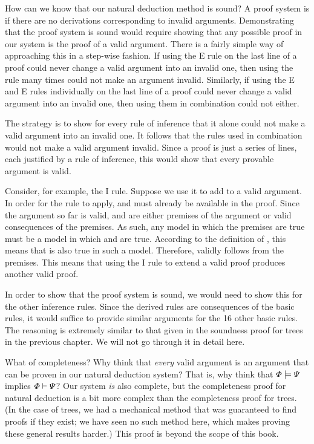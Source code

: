 How can we know that our natural deduction method is sound? A proof system is  if there are no derivations corresponding to invalid arguments. Demonstrating that the proof system is sound would require showing that any possible proof in our system is the proof of a valid argument. There is a fairly simple way of approaching this in a step-wise fashion. If using the {\eand}E rule on the last line of a proof could never change a valid argument into an invalid one, then using the rule many times could not make an argument invalid. Similarly, if using the {\eand}E and {\eor}E rules individually on the last line of a proof could never change a valid argument into an invalid one, then using them in combination could not either.

The strategy is to show for every rule of inference that it alone could not make a valid argument into an invalid one. It follows that the rules used in combination would not make a valid argument invalid. Since a proof is just a series of lines, each justified by a rule of inference, this would show that every provable argument is valid.

Consider, for example, the {\eand}I rule. Suppose we use it to add \metaA{}\eand\metaB{} to a valid argument. In order for the rule to apply, \metaA{} and \metaB{} must already be available in the proof. Since the argument so far is valid, \metaA{} and \metaB{} are either premises of the argument or valid consequences of the premises. As such, any model in which the premises are true must be a model in which \metaA{} and \metaB{} are true. According to the definition of , this means that \metaA{}\eand\metaB{} is also true in such a model. Therefore, \metaA{}\eand\metaB{} validly follows from the premises. This means that using the {\eand}I rule to extend a valid proof produces another valid proof.

In order to show that the proof system is sound, we would need to show this for the other inference rules. Since the derived rules are consequences of the basic rules, it would suffice to provide similar arguments for the 16 other basic rules. The reasoning is extremely similar to that given in the soundness proof for trees in the previous chapter. We will not go through it in detail here.

What of completeness? Why think that \emph{every} valid argument is an argument that can be proven in our natural deduction system? That is, why think that $\varPhi{}\models\varPsi{}$ implies $\varPhi{}\vdash\varPsi{}$? Our system \emph{is} also complete, but the completeness proof for natural deduction is a bit more complex than the completeness proof for trees. (In the case of trees, we had a mechanical method that was guaranteed to find proofs if they exist; we have seen no such method here, which makes proving these general results harder.) This proof is beyond the scope of this book.

